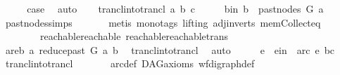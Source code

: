 \begin{isabellebody}
\ \ \isamarkupfalse%
\ \isamarkupfalse%
\ {\isacharquery}{\kern0pt}case\ \isamarkupfalse%
\ auto\isanewline
{}\isamarkupfalse%
\isanewline
\ \ \isamarkupfalse%
\ {\isacharparenleft}{\kern0pt}trancl{\isacharunderscore}{\kern0pt}into{\isacharunderscore}{\kern0pt}trancl\ a{}\ b\ c{\isacharparenright}{\kern0pt}\isanewline
\ \ \isamarkupfalse%
\ \isamarkupfalse%
\ b{\isacharunderscore}{\kern0pt}in{\isacharcolon}{\kern0pt}\ {\isachardoublequoteopen}b\ {\isasymin}\ past{\isacharunderscore}{\kern0pt}nodes\ G\ a{\isachardoublequoteclose}\ \isamarkupfalse%
\ past{\isacharunderscore}{\kern0pt}nodes{\isachardot}{\kern0pt}simps\ \isanewline
\ \ \ \ \isamarkupfalse%
\ {\isacharparenleft}{\kern0pt}metis\ {\isacharparenleft}{\kern0pt}mono{\isacharunderscore}{\kern0pt}tags{\isacharcomma}{\kern0pt}\ lifting{\isacharparenright}{\kern0pt}\ adj{\isacharunderscore}{\kern0pt}in{\isacharunderscore}{\kern0pt}verts{\isacharparenleft}{\kern0pt}{}{\isacharparenright}{\kern0pt}\ mem{\isacharunderscore}{\kern0pt}Collect{\isacharunderscore}{\kern0pt}eq\isanewline
\ \ \ \ \ \ \ \ reachable{}{\isacharunderscore}{\kern0pt}reachable\ reachable{}{\isacharunderscore}{\kern0pt}reachable{\isacharunderscore}{\kern0pt}trans{\isacharparenright}{\kern0pt}\ \isanewline
\ \ \isamarkupfalse%
\ \isamarkupfalse%
\ a{}{\isacharunderscore}{\kern0pt}re{\isacharunderscore}{\kern0pt}b{\isacharcolon}{\kern0pt}\ {\isachardoublequoteopen}a{}\ {\isasymrightarrow}\isactrlsup {\isacharplus}{\kern0pt}\isactrlbsub reduce{\isacharunderscore}{\kern0pt}past\ G\ a\isactrlesub \ b{\isachardoublequoteclose}\ \isamarkupfalse%
\ trancl{\isacharunderscore}{\kern0pt}into{\isacharunderscore}{\kern0pt}trancl\ \isamarkupfalse%
\ auto\isanewline
\ \ \isamarkupfalse%
\ \isamarkupfalse%
\ e\ \ e{\isacharunderscore}{\kern0pt}in{\isacharcolon}{\kern0pt}\ {\isachardoublequoteopen}\ arc\ e\ {\isacharparenleft}{\kern0pt}b{\isacharcomma}{\kern0pt}c{\isacharparenright}{\kern0pt}{\isachardoublequoteclose}\ \isamarkupfalse%
\ trancl{\isacharunderscore}{\kern0pt}into{\isacharunderscore}{\kern0pt}trancl\ \isanewline
\ \ \ \ \ \ arc{\isacharunderscore}{\kern0pt}def\ DAG{\isacharunderscore}{\kern0pt}axioms\ wf{\isacharunderscore}{\kern0pt}digraph{\isacharunderscore}{\kern0pt}def\ \isamarkupfalse%

\end{isabellebody}
